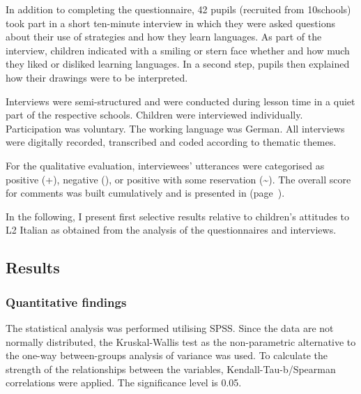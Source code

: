 \documentclass[output=paper]{../langscibook}
\begin{document}
In addition to completing the questionnaire, 42 pupils (recruited from 10\linebreak schools) took part in a short ten-minute interview in which they were asked questions about their use of strategies and how they learn languages. As part of the interview, children indicated with a smiling or stern face whether and how much they liked or disliked learning languages. In a second step, pupils then explained how their drawings were to be interpreted. 




\largerpage
Interviews were semi-structured and were conducted during lesson time in a quiet part of the respective schools. Children were interviewed individually. Participation was voluntary. The working language was German. All interviews were digitally recorded, transcribed and coded according to thematic themes. 

For the qualitative evaluation, interviewees’ utterances were categorised as positive (+), negative (\textminus), or positive with some reservation ({\textasciitilde}). The overall score for comments was built cumulatively and is presented in  (page~\pageref{tab:7:5}). 

In the following, I present first selective results relative to children’s attitudes to L2 Italian as obtained from the analysis of the questionnaires and interviews.

\largerpage
\subsection{Results}\label{sec:hofer:6.5}
\subsubsection{Quantitative findings}


The statistical analysis was performed utilising SPSS. Since the data are not normally distributed, the Kruskal-Wallis test as the non-parametric alternative to the one-way between-groups analysis of variance was used. To calculate the strength of the relationships between the variables, Kendall-Tau-b\slash Spearman correlations were applied. The significance level is 0.05.
\end{document}

